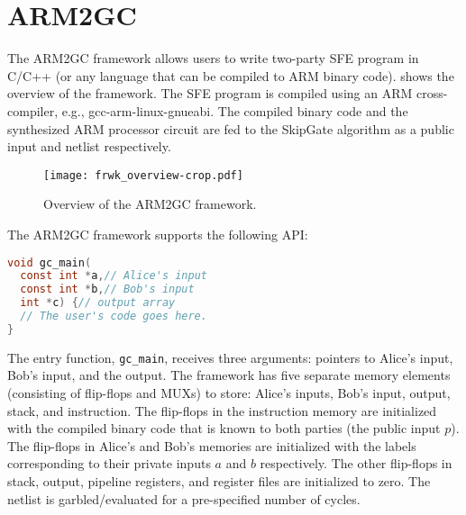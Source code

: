 \section{ARM2GC}
The ARM2GC framework allows users to write two-party SFE program in C/C++ (or any language that can be compiled to ARM binary code).
 shows the overview of the framework.
The SFE program is compiled using an ARM cross-compiler, e.g., gcc-arm-linux-gnueabi.
The compiled binary code and the synthesized ARM processor circuit are fed to the SkipGate algorithm as a public input and netlist respectively.

\begin{figure}[ht]
\centering
\texttt{[image: frwk\_overview-crop.pdf]}
\caption{Overview of the ARM2GC framework.}\label{fig:frwk_overview}
\end{figure}

The ARM2GC framework supports the following API:
\begin{lstlisting}[language=C,basicstyle=\ttfamily,keywordstyle=\color{blue}\ttfamily,stringstyle=\color{red}\ttfamily,commentstyle=\color{CommentColor}\ttfamily]
void gc_main(
  const int *a,// Alice's input
  const int *b,// Bob's input
  int *c) {// output array
  // The user's code goes here.
}
\end{lstlisting}

The entry function, \texttt{gc\_main}, receives three arguments: pointers to Alice's input, Bob's input, and the output.
The framework has five separate memory elements (consisting of flip-flops and MUXs) to store: Alice's inputs, Bob's input, output, stack, and instruction.
The flip-flops in the instruction memory are initialized with the compiled binary code that is known to both parties (the public input $p$).
The flip-flops in Alice's and Bob's memories are initialized with the labels corresponding to their private inputs $a$ and $b$ respectively.
The other flip-flops in stack, output, pipeline registers, and register files are initialized to zero.
The netlist is garbled/evaluated for a pre-specified number of cycles.

